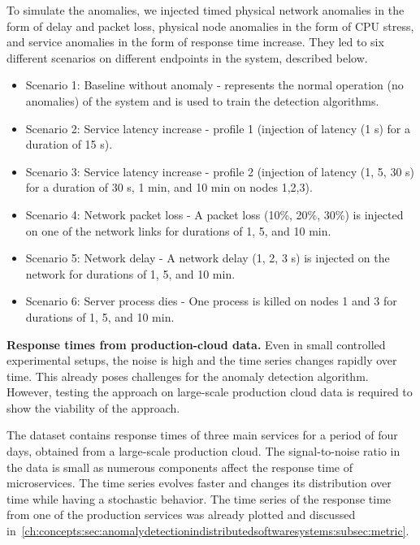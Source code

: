 To simulate the anomalies, we injected timed physical network anomalies in the form of delay and packet loss, physical node anomalies in the form of CPU stress, and service anomalies in the form of response time increase. They led to six different scenarios on different endpoints in the system, described below. 

\begin{itemize}
    \item Scenario 1: Baseline without anomaly - represents the normal operation (no anomalies) of the system and is used to train the detection algorithms.
    \item Scenario 2: Service latency increase - profile 1 (injection of latency (1 s) for a duration of 15 s).
    \item Scenario 3: Service latency increase - profile 2 (injection of latency (1, 5, 30 s) for a duration of 30 s, 1 min, and 10 min on nodes 1,2,3).
    \item Scenario 4: Network packet loss - A packet loss (10\%, 20\%, 30\%) is injected on one of the network links for durations of 1, 5, and 10 min. 
    \item Scenario 5: Network delay - A network delay (1, 2, 3 s) is injected on the network for durations of 1, 5, and 10 min.
    \item Scenario 6: Server process dies -  One process is killed on nodes 1 and 3 for durations of 1, 5, and 10 min.
\end{itemize}


\textbf{Response times from production-cloud data.}
Even in small controlled experimental setups, the noise is high and the time series changes rapidly over time. This already poses challenges for the anomaly detection algorithm. However, testing the approach on large-scale production cloud data is required to show the viability of the approach.

The dataset contains response times of three main services for a period of four days, obtained from a large-scale production cloud. 
The signal-to-noise ratio in the data is small as numerous components affect the response time of microservices. The time series evolves faster and changes its distribution over time while having a stochastic behavior. The time series of the response time from one of the production services was already plotted and discussed in~\autoref{ch:concepts:sec:anomalydetectionindistributedsoftwaresystems:subsec:metric}.

